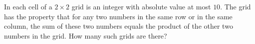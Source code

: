 In each cell of a $2\times2$ grid is an integer with absolute value at most $10$. The grid has the property that for any two numbers in the same row or in the same column, the sum of these two numbers equals the product of the other two numbers in the grid. How many such grids are there?
